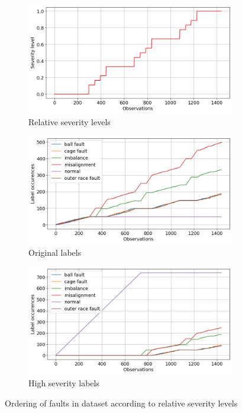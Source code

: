 \begin{figure}[h]
    \centering
    \begin{subfigure}[b]{0.32\textwidth}
        \includegraphics[width=\textwidth]{assets/results/incremental-learning/severity-levels.png}
        \caption{Relative severity levels}
        \label{fig:design:online-count-severity-level}
    \end{subfigure}
    \hfill
    \begin{subfigure}[b]{0.32\textwidth}
        \includegraphics[width=\textwidth]{assets/results/incremental-learning/order-natural.png}
        \caption{Original labels}
        \label{fig:design:online-event-order}
    \end{subfigure}
    \hfill
    \begin{subfigure}[b]{0.32\textwidth}
        \includegraphics[width=\textwidth]{assets/results/incremental-learning/order-severity.png}
        \caption{High severity labels}
         \label{fig:design:online-event-order-severity}
    \end{subfigure}
    \caption{Ordering of faults in dataset according to relative severity levels}
\end{figure}

